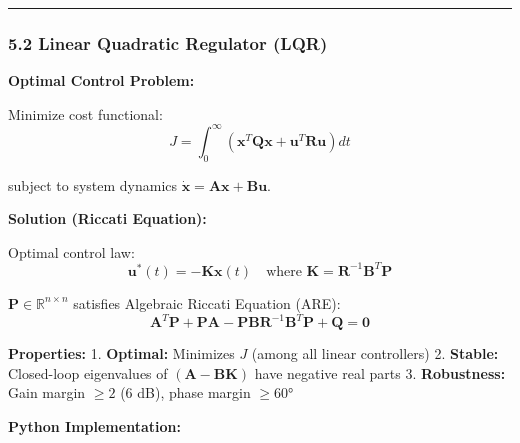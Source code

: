 \documentclass[
]{article}
\begin{document}
\begin{center}\rule{0.5\linewidth}{0.5pt}\end{center}

\hypertarget{linear-quadratic-regulator-lqr}{%
\subsubsection{5.2 Linear Quadratic Regulator
(LQR)}\label{linear-quadratic-regulator-lqr}}

\textbf{Optimal Control Problem:}

Minimize cost functional: \[
J = \int_0^\infty \left( \mathbf{x}^T \mathbf{Q} \mathbf{x} + \mathbf{u}^T \mathbf{R} \mathbf{u} \right) dt
\]

subject to system dynamics
\(\dot{\mathbf{x}} = \mathbf{A} \mathbf{x} + \mathbf{B} \mathbf{u}\).

\textbf{Solution (Riccati Equation):}

Optimal control law: \[
\mathbf{u}^*(t) = -\mathbf{K} \mathbf{x}(t) \quad \text{where } \mathbf{K} = \mathbf{R}^{-1} \mathbf{B}^T \mathbf{P}
\]

\(\mathbf{P} \in \mathbb{R}^{n \times n}\) satisfies Algebraic Riccati
Equation (ARE): \[
\mathbf{A}^T \mathbf{P} + \mathbf{P} \mathbf{A} - \mathbf{P} \mathbf{B} \mathbf{R}^{-1} \mathbf{B}^T \mathbf{P} + \mathbf{Q} = \mathbf{0}
\]

\textbf{Properties:} 1. \textbf{Optimal:} Minimizes \(J\) (among all
linear controllers) 2. \textbf{Stable:} Closed-loop eigenvalues of
\((\mathbf{A} - \mathbf{B}\mathbf{K})\) have negative real parts 3.
\textbf{Robustness:} Gain margin \(\geq 2\) (6 dB), phase margin
\(\geq 60°\)

\textbf{Python Implementation:}
\end{document}
